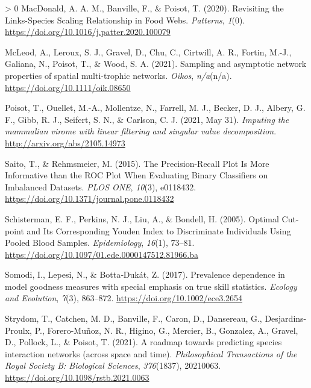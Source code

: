 \documentclass[10pt,oneside]{article}
\newlength{\cslhangindent}
\newenvironment{CSLReferences}[3] %
 {%
  \setlength{\parindent}{0pt}
  \ifodd #1 \everypar{\setlength{\hangindent}{\cslhangindent}}\ignorespaces\fi
  \ifnum #2 > 0
  \setlength{\parskip}{#2\baselineskip}
  \fi
 }%
 {}
\begin{document}
\begin{CSLReferences}{1}{0}
\leavevmode\hypertarget{ref-MacDonald2020RevLin}{}%
MacDonald, A. A. M., Banville, F., \& Poisot, T. (2020). Revisiting the
Links-Species Scaling Relationship in Food Webs. \emph{Patterns},
\emph{1}(0). \url{https://doi.org/10.1016/j.patter.2020.100079}

\leavevmode\hypertarget{ref-McLeod2021SamAsy}{}%
McLeod, A., Leroux, S. J., Gravel, D., Chu, C., Cirtwill, A. R., Fortin,
M.-J., Galiana, N., Poisot, T., \& Wood, S. A. (2021). Sampling and
asymptotic network properties of spatial multi-trophic networks.
\emph{Oikos}, \emph{n/a}(n/a). \url{https://doi.org/10.1111/oik.08650}

\leavevmode\hypertarget{ref-Poisot2021ImpMam}{}%
Poisot, T., Ouellet, M.-A., Mollentze, N., Farrell, M. J., Becker, D.
J., Albery, G. F., Gibb, R. J., Seifert, S. N., \& Carlson, C. J. (2021,
May 31). \emph{Imputing the mammalian virome with linear filtering and
singular value decomposition}. \url{http://arxiv.org/abs/2105.14973}

\leavevmode\hypertarget{ref-Saito2015PrePlo}{}%
Saito, T., \& Rehmsmeier, M. (2015). The Precision-Recall Plot Is More
Informative than the ROC Plot When Evaluating Binary Classifiers on
Imbalanced Datasets. \emph{PLOS ONE}, \emph{10}(3), e0118432.
\url{https://doi.org/10.1371/journal.pone.0118432}

\leavevmode\hypertarget{ref-Schisterman2005OptCut}{}%
Schisterman, E. F., Perkins, N. J., Liu, A., \& Bondell, H. (2005).
Optimal Cut-point and Its Corresponding Youden Index to Discriminate
Individuals Using Pooled Blood Samples. \emph{Epidemiology},
\emph{16}(1), 73--81.
\url{https://doi.org/10.1097/01.ede.0000147512.81966.ba}

\leavevmode\hypertarget{ref-Somodi2017PreDep}{}%
Somodi, I., Lepesi, N., \& Botta‐Dukát, Z. (2017). Prevalence dependence
in model goodness measures with special emphasis on true skill
statistics. \emph{Ecology and Evolution}, \emph{7}(3), 863--872.
\url{https://doi.org/10.1002/ece3.2654}

\leavevmode\hypertarget{ref-Strydom2021RoaPre}{}%
Strydom, T., Catchen, M. D., Banville, F., Caron, D., Dansereau, G.,
Desjardins-Proulx, P., Forero-Muñoz, N. R., Higino, G., Mercier, B.,
Gonzalez, A., Gravel, D., Pollock, L., \& Poisot, T. (2021). A roadmap
towards predicting species interaction networks (across space and time).
\emph{Philosophical Transactions of the Royal Society B: Biological
Sciences}, \emph{376}(1837), 20210063.
\url{https://doi.org/10.1098/rstb.2021.0063}


\end{CSLReferences}
\end{document}
